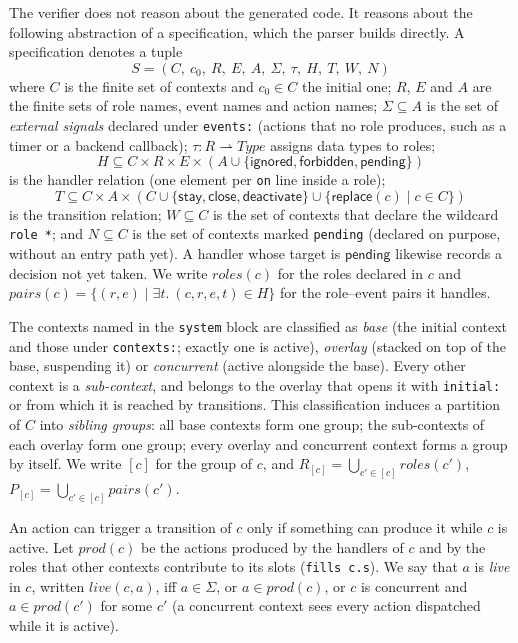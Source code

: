The verifier does not reason about the generated code. It reasons about the
following abstraction of a specification, which the parser builds directly.
A specification denotes a tuple
\[
  S = (C,\ c_0,\ R,\ E,\ A,\ \Sigma,\ \tau,\ H,\ T,\ W,\ N)
\]
where $C$ is the finite set of contexts and $c_0 \in C$ the initial one;
$R$, $E$ and $A$ are the finite sets of role names, event names and action
names; $\Sigma \subseteq A$ is the set of \emph{external signals} declared
under \texttt{events:} (actions that no role produces, such as a timer or a
backend callback); $\tau : R \rightharpoonup \mathit{Type}$ assigns data types to roles;
\[
  H \subseteq C \times R \times E \times (A \cup \{\mathsf{ignored},\mathsf{forbidden},\mathsf{pending}\})
\]
is the handler relation (one element per \texttt{on} line inside a role);
\[
  T \subseteq C \times A \times (C \cup \{\mathsf{stay},\mathsf{close},\mathsf{deactivate}\} \cup \{\mathsf{replace}(c) \mid c \in C\})
\]
is the transition relation; $W \subseteq C$ is the set of contexts that
declare the wildcard \texttt{role *}; and $N \subseteq C$ is the set of
contexts marked \texttt{pending} (declared on purpose, without an entry
path yet). A handler whose target is $\mathsf{pending}$ likewise records a
decision not yet taken. We write $\mathit{roles}(c)$ for the
roles declared in $c$ and
$\mathit{pairs}(c) = \{(r,e) \mid \exists t.\ (c,r,e,t) \in H\}$ for the
role--event pairs it handles.

The contexts named in the \texttt{system} block are classified as
\emph{base} (the initial context and those under \texttt{contexts:}; exactly
one is active), \emph{overlay} (stacked on top of the base, suspending it) or
\emph{concurrent} (active alongside the base). Every other context is a
\emph{sub-context}, and belongs to the overlay that opens it with
\texttt{initial:} or from which it is reached by transitions. This
classification induces a partition of $C$ into \emph{sibling groups}:
all base contexts form one group; the sub-contexts of each overlay form
one group; every overlay and concurrent context forms a group by itself.
We write $[c]$ for the group of $c$, and
$R_{[c]} = \bigcup_{c' \in [c]} \mathit{roles}(c')$,
$P_{[c]} = \bigcup_{c' \in [c]} \mathit{pairs}(c')$.

An action can trigger a transition of $c$ only if something can produce it
while $c$ is active. Let $\mathit{prod}(c)$ be the actions produced by the
handlers of $c$ and by the roles that other contexts contribute to its slots
(\texttt{fills c.s}). We say that $a$ is \emph{live} in $c$, written
$\mathit{live}(c,a)$, iff $a \in \Sigma$, or $a \in \mathit{prod}(c)$, or
$c$ is concurrent and $a \in \mathit{prod}(c')$ for some $c'$ (a concurrent
context sees every action dispatched while it is active).

